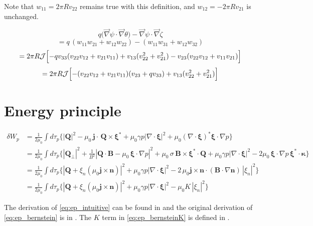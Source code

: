 \documentclass[10pt,a4paper]{article}
\numberwithin{equation}{section}
\begin{document}
Note that $w_{11} = 2 \pi R v_{22}$ remains true with this definition, and
$w_{12} = -2 \pi R v_{21}$ is unchanged.


\[
q\bigl({\vec{\nabla}} \psi \cdot {\vec{\nabla}} \theta \bigr)
- {\vec{\nabla}} \psi \cdot {\vec{\nabla}} \zeta 
\]
\[
= q\,(w_{11} w_{21} + w_{12} w_{22})
 - (w_{11} w_{31} + w_{12} w_{32})
\]
\[
= 2\pi R \mathcal{J} \Bigl[
   - q v_{33} (v_{22} v_{12} + v_{21} v_{11})
   + v_{13}(v_{22}^2 + v_{21}^2)
   - v_{23}(v_{22} v_{12} + v_{11} v_{21})
\Bigr]
\]
\[
= 2\pi R \mathcal{J} \Bigl[
   - (v_{22} v_{12} + v_{21} v_{11})(v_{23}+q v_{33})
   + v_{13}(v_{22}^2 + v_{21}^2)
\Bigr]
\]

\section{Energy principle\cite{RevModPhys.76.1071}\cite{Park2009Ideal}}
\begin{align}
\delta W_p &= \frac{1}{2\mu_0} \int d\tau_p 
\Big\{ |\mathbf{Q}|^2 - \mu_0\,\mathbf{j} \cdot \, \mathbf{Q} \times \boldsymbol{\xi}^*
+ \mu_0 \gamma p |\nabla \cdot \boldsymbol{\xi}|^2
+ \mu_0 (\nabla \cdot \boldsymbol{\xi})^* \boldsymbol{\xi} \cdot \nabla p \Big\} \label{eq:ep_first}\\
&= \frac{1}{2\mu_0} \int d\tau_p 
\Big\{ |\mathbf{Q}_\perp|^2 
+ \frac{1}{B^2} |\mathbf{Q} \cdot \mathbf{B} - \mu_0\,\boldsymbol{\xi} \cdot \nabla p|^2
+ \mu_0\,\sigma\, \mathbf{B} \times \boldsymbol{\xi}^* \cdot \mathbf{Q}
+ \mu_0 \gamma p |\nabla \cdot \boldsymbol{\xi}|^2
- 2 \mu_0\,\boldsymbol{\xi} \cdot \nabla p\, \boldsymbol{\xi}^* \cdot \boldsymbol{\kappa}
\Big\} \label{eq:ep_intuitive}\\
&= \frac{1}{2\mu_0} \int d\tau_p 
\Big\{ |\mathbf{Q} + \xi_n (\mu_0\mathbf{j} \times \mathbf{n})|^2 
+ \mu_0 \gamma p |\nabla \cdot \boldsymbol{\xi}|^2 
- 2\,\mu_0\mathbf{j} \times \mathbf{n} \cdot (\mathbf{B} \cdot \nabla \mathbf{n})\, |\xi_n|^2
\Big\}\label{eq:ep_bernstein}\\
&= \frac{1}{2\mu_0} \int d\tau_p 
\Big\{ |\mathbf{Q} + \xi_n (\mu_0 \mathbf{j} \times \mathbf{n})|^2 
+ \mu_0 \gamma p |\nabla \cdot \boldsymbol{\xi}|^2 
- \mu_0 K\, |\xi_n|^2
\Big\}\label{eq:ep_bernsteinK}
\end{align}

The derivation of \eqref{eq:ep_intuitive} can be found in \cite{RevModPhys.76.1071} and the original derivation of \eqref{eq:ep_bernstein} is in \cite{Bernstein1983}.
The $K$ term in \eqref{eq:ep_bernsteinK} is defined in \cite{chance1992mhd}.
\end{document}
